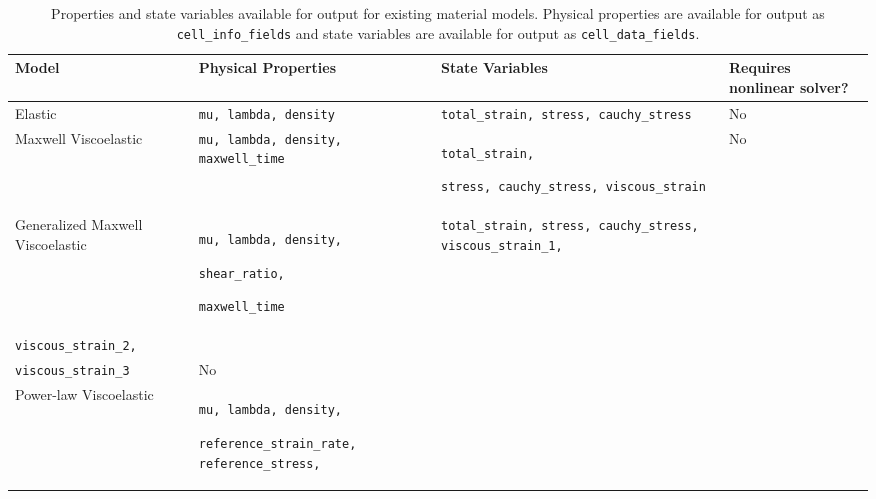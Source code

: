 \noindent \begin{center}
\begin{table}[H]
\centering{}\caption{\label{tab:material-model-output}Properties and state variables available
for output for existing material models. Physical properties are available
for output as \texttt{cell\_info\_fields} and state variables are
available for output as \texttt{cell\_data\_fields}.}
\begin{tabular}{|>{\centering}p{1.5in}|>{\centering}p{1.8in}|>{\centering}p{1.5in}|>{\centering}p{1in}|}
\hline 
\textbf{Model} & \textbf{Physical Properties} & \textbf{State Variables} & \textbf{Requires nonlinear solver?}\tabularnewline
\hline 
\hline 
Elastic & \texttt{mu, lambda, density} & \texttt{total\_strain, stress, cauchy\_stress} & No\tabularnewline
\hline 
Maxwell Viscoelastic & \texttt{mu, lambda, density, maxwell\_time} & \texttt{total\_strain,}

\texttt{stress, cauchy\_stress, viscous\_strain} & No\tabularnewline
\hline 
Generalized Maxwell Viscoelastic & \texttt{mu, lambda, density,}

\texttt{shear\_ratio,}

\texttt{maxwell\_time} & \texttt{total\_strain, stress, cauchy\_stress, viscous\_strain\_1,}~\\
\texttt{viscous\_strain\_2,}~\\
\texttt{viscous\_strain\_3} & No\tabularnewline
\hline 
Power-law Viscoelastic & \texttt{mu, lambda, density,}

\texttt{reference\_strain\_rate, reference\_stress,}


\end{tabular}
\end{table}
\end{center}
